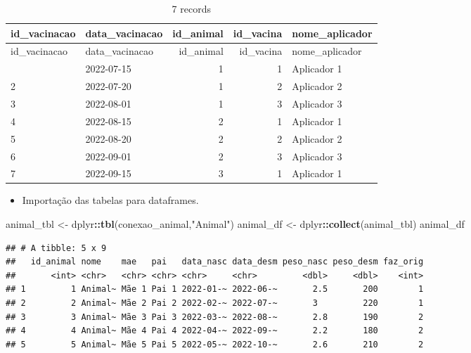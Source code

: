 \documentclass[
]{article}
\newenvironment{Shaded}{\begin{snugshade}}{\end{snugshade}}
\newcommand{\FunctionTok}[1]{\textcolor[rgb]{0.13,0.29,0.53}{\textbf{#1}}}
\newcommand{\NormalTok}[1]{#1}
\newcommand{\OtherTok}[1]{\textcolor[rgb]{0.56,0.35,0.01}{#1}}
\newcommand{\SpecialCharTok}[1]{\textcolor[rgb]{0.81,0.36,0.00}{\textbf{#1}}}
\newcommand{\StringTok}[1]{\textcolor[rgb]{0.31,0.60,0.02}{#1}}
\providecommand{\tightlist}{%
  \setlength{\itemsep}{0pt}\setlength{\parskip}{0pt}}
\begin{document}
\begin{longtable}[]{@{}llrrl@{}}
\caption{7 records}\tabularnewline
\toprule\noalign{}
id\_vacinacao & data\_vacinacao & id\_animal & id\_vacina &
nome\_aplicador \\
\midrule\noalign{}
\endfirsthead
\toprule\noalign{}
id\_vacinacao & data\_vacinacao & id\_animal & id\_vacina &
nome\_aplicador \\
\midrule\noalign{}
\endhead
\bottomrule\noalign{}
\endlastfoot
1 & 2022-07-15 & 1 & 1 & Aplicador 1 \\
2 & 2022-07-20 & 1 & 2 & Aplicador 2 \\
3 & 2022-08-01 & 1 & 3 & Aplicador 3 \\
4 & 2022-08-15 & 2 & 1 & Aplicador 1 \\
5 & 2022-08-20 & 2 & 2 & Aplicador 2 \\
6 & 2022-09-01 & 2 & 3 & Aplicador 3 \\
7 & 2022-09-15 & 3 & 1 & Aplicador 1 \\
\end{longtable}

\begin{itemize}
\tightlist
\item
  Importação das tabelas para dataframes.
\end{itemize}

\begin{Shaded}
\begin{Highlighting}[]
\NormalTok{animal\_tbl }\OtherTok{\textless{}{-}}\NormalTok{ dplyr}\SpecialCharTok{::}\FunctionTok{tbl}\NormalTok{(conexao\_animal,}\StringTok{"Animal"}\NormalTok{)}
\NormalTok{animal\_df }\OtherTok{\textless{}{-}}\NormalTok{ dplyr}\SpecialCharTok{::}\FunctionTok{collect}\NormalTok{(animal\_tbl)}
\NormalTok{animal\_df}
\end{Highlighting}
\end{Shaded}

\begin{verbatim}
## # A tibble: 5 x 9
##   id_animal nome    mae   pai   data_nasc data_desm peso_nasc peso_desm faz_orig
##       <int> <chr>   <chr> <chr> <chr>     <chr>         <dbl>     <dbl>    <int>
## 1         1 Animal~ Mãe 1 Pai 1 2022-01-~ 2022-06-~       2.5       200        1
## 2         2 Animal~ Mãe 2 Pai 2 2022-02-~ 2022-07-~       3         220        1
## 3         3 Animal~ Mãe 3 Pai 3 2022-03-~ 2022-08-~       2.8       190        2
## 4         4 Animal~ Mãe 4 Pai 4 2022-04-~ 2022-09-~       2.2       180        2
## 5         5 Animal~ Mãe 5 Pai 5 2022-05-~ 2022-10-~       2.6       210        2
\end{verbatim}
\end{document}
